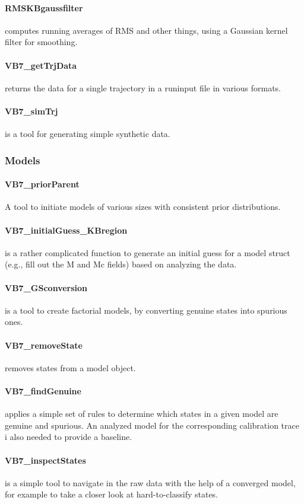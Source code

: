 \paragraph{RMSKBgaussfilter}
computes running averages of RMS and other things, using a Gaussian
kernel filter for smoothing.
\paragraph{VB7\_getTrjData} 
returns the data for a single trajectory in a runinput file in various
formats.
\paragraph{VB7_simTrj} is a tool for generating simple synthetic data.

\subsubsection{Models}
\paragraph{VB7\_priorParent} 
A tool to initiate models of various sizes with consistent prior
distributions.
\paragraph{VB7\_initialGuess\_KBregion} 
is a rather complicated function to generate an initial guess for a
model struct (e.g., fill out the M and Mc fields) based on analyzing
the data.
\paragraph{VB7\_GSconversion}
is a tool to create factorial models, by converting genuine states
into spurious ones.
\paragraph{VB7\_removeState}
removes states from a model object.
\paragraph{VB7\_findGenuine}
applies a simple set of rules to determine which states in a given
model are genuine and spurious. An analyzed model for the
corresponding calibration trace i also needed to provide a baseline.
\paragraph{VB7\_inspectStates} 
is a simple tool to navigate in the raw data with the help of a
converged model, for example to take a closer look at hard-to-classify
states.

